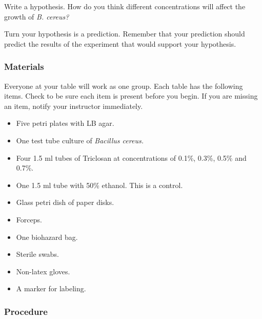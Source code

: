 \documentclass[12pt]{exam}
\begin{document}
\begin{questions}

\question
Write a hypothesis. How do you think different concentrations will affect the growth of \textit{B. cereus?}

\newpage

\question
Turn your hypothesis is a prediction. Remember that your prediction should predict the results of the experiment that would support your hypothesis. 

\vspace*{3\baselineskip}

\subsubsection*{Materials}

Everyone at your table will work as one group. Each table has the following items. Check to be sure each item is present before you begin. If you are missing an item, notify your instructor immediately.

\begin{itemize}

	\item Five petri plates with LB agar.
	
	\item One test tube culture of \textit{Bacillus cereus.}
	
	\item Four 1.5 ml tubes of Triclosan at concentrations of 0.1\%, 0.3\%, 0.5\% and 0.7\%.
	
	\item One 1.5 ml tube with 50\% ethanol. This is a control.

	\item Glass petri dish of paper disks.
	
	\item Forceps.
	
	\item One biohazard bag.
	
	\item Sterile swabs.
	
	\item Non-latex gloves.
	
	\item A marker for labeling.
	
\end{itemize}

\subsubsection*{Procedure}


\end{questions}
\end{document}
